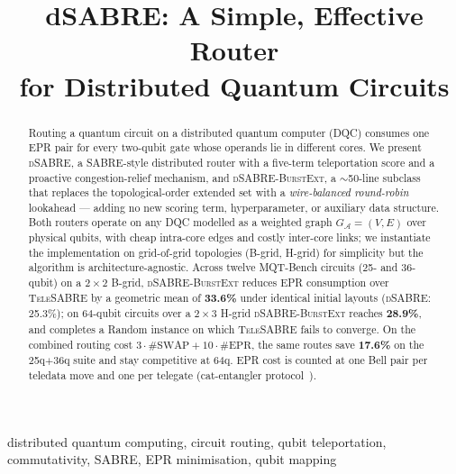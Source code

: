 \documentclass[conference]{IEEEtran}
\newcommand{\dSABRE}{\textsc{dSABRE}}
\newcommand{\BurstExt}{\textsc{dSABRE-BurstExt}}
\newcommand{\TeleSABRE}{\textsc{TeleSABRE}}
\newcommand{\SABRE}{\textsc{SABRE}}
\newcommand{\arch}{\mathcal{A}}
\begin{document}
\title{dSABRE: A Simple, Effective Router\\
       for Distributed Quantum Circuits}

\author{
}

\maketitle

\begin{abstract}
Routing a quantum circuit on a distributed quantum computer (DQC) consumes
one EPR pair for every two-qubit gate whose operands lie in different cores.
We present \dSABRE{}, a \SABRE{}-style distributed router with a five-term
teleportation score and a proactive congestion-relief mechanism, and
\BurstExt{}, a $\sim$50-line subclass that replaces the topological-order
extended set with a \emph{wire-balanced round-robin} lookahead --- adding no
new scoring term, hyperparameter, or auxiliary data structure.
Both routers operate on any DQC modelled as a weighted graph
$G_\arch=(V,E)$ over physical qubits, with cheap intra-core edges and
costly inter-core links; we instantiate the implementation on grid-of-grid
topologies (B-grid, H-grid) for simplicity but the algorithm is
architecture-agnostic.
Across twelve MQT-Bench circuits (25- and 36-qubit) on a $2\!\times\!2$
B-grid, \BurstExt{} reduces EPR consumption over \TeleSABRE{}
\cite{russo2025telesabre} by a geometric mean of \textbf{33.6\%} under
identical initial layouts (\dSABRE{}: 25.3\%); on 64-qubit circuits over a
$2\!\times\!3$ H-grid \BurstExt{} reaches \textbf{28.9\%}, and completes a
Random instance on which \TeleSABRE{} fails to converge.
On the combined routing cost
$3\!\cdot\!\#\mathrm{SWAP}+10\!\cdot\!\#\mathrm{EPR}$, the same routes save
\textbf{17.6\%} on the 25q$+$36q suite and stay competitive at 64q.
EPR cost is counted at one Bell pair per teledata move and one per telegate
(cat-entangler protocol~\cite{eisert2000optimal,yimsiriwattana2004generalized}).
\end{abstract}

\begin{IEEEkeywords}
distributed quantum computing, circuit routing, qubit teleportation,
commutativity, SABRE, EPR minimisation, qubit mapping
\end{IEEEkeywords}
\end{document}

